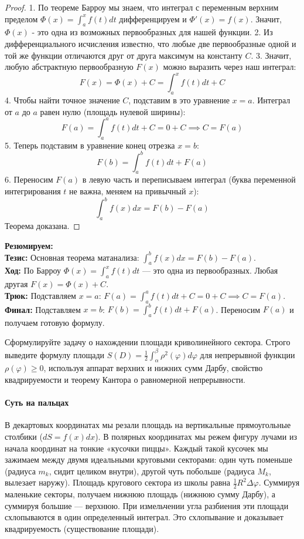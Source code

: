\begin{proof}
1. По теореме Барроу мы знаем, что интеграл с переменным верхним пределом $\Phi(x) = \int_a^x f(t)dt$ дифференцируем и $\Phi'(x) = f(x)$. Значит, $\Phi(x)$ - это одна из возможных первообразных для нашей функции.
2. Из дифференциального исчисления известно, что любые две первообразные одной и той же функции отличаются друг от друга максимум на константу $C$.
3. Значит, любую абстрактную первообразную $F(x)$ можно выразить через наш интеграл:
$$ F(x) = \Phi(x) + C = \int_a^x f(t)dt + C $$
4. Чтобы найти точное значение $C$, подставим в это уравнение $x = a$. Интеграл от $a$ до $a$ равен нулю (площадь нулевой ширины):
$$ F(a) = \int_a^a f(t)dt + C = 0 + C \implies C = F(a) $$
5. Теперь подставим в уравнение конец отрезка $x = b$:
$$ F(b) = \int_a^b f(t)dt + F(a) $$
6. Переносим $F(a)$ в левую часть и переписываем интеграл (буква переменной интегрирования $t$ не важна, меняем на привычный $x$):
$$ \int_a^b f(x)dx = F(b) - F(a) $$
Теорема доказана.
\end{proof}

\begin{tcolorbox}[colback=gray!5, colframe=black, boxrule=0.5pt, arc=0pt]
\textbf{Резюмируем:} \\
\textbf{Тезис:} Основная теорема матанализа: $\int_a^b f(x)dx = F(b) - F(a)$. \\
\textbf{Ход:} По Барроу $\Phi(x) = \int_a^x f(t)dt$ — это одна из первообразных. Любая другая $F(x) = \Phi(x) + C$. \\
\textbf{Трюк:} Подставляем $x = a$: $F(a) = \int_a^a f(t)dt + C = 0 + C \implies C = F(a)$. \\
\textbf{Финал:} Подставляем $x = b$: $F(b) = \int_a^b f(t)dt + F(a)$. Переносим $F(a)$ и получаем готовую формулу.
\end{tcolorbox}


{Сформулируйте задачу о нахождении площади криволинейного сектора. Строго выведите формулу площади $S(D) = \frac{1}{2} \int_{\alpha}^{\beta} \rho^2(\varphi) d\varphi$ для непрерывной функции $\rho(\varphi) \ge 0$, используя аппарат верхних и нижних сумм Дарбу, свойство квадрируемости и теорему Кантора о равномерной непрерывности.}

\paragraph{Суть на пальцах}
В декартовых координатах мы резали площадь на вертикальные прямоугольные столбики ($dS = f(x)dx$). В полярных координатах мы режем фигуру лучами из начала координат на тонкие «кусочки пиццы». 
Каждый такой кусочек мы зажимаем между двумя идеальными круговыми секторами: один чуть поменьше (радиуса $m_k$, сидит целиком внутри), другой чуть побольше (радиуса $M_k$, вылезает наружу). Площадь кругового сектора из школы равна $\frac{1}{2}R^2 \Delta \varphi$. 
Суммируя маленькие секторы, получаем нижнюю площадь (нижнюю сумму Дарбу), а суммируя большие — верхнюю. При измельчении угла разбиения эти площади схлопываются в один определенный интеграл. Это схлопывание и доказывает квадрируемость (существование площади).

